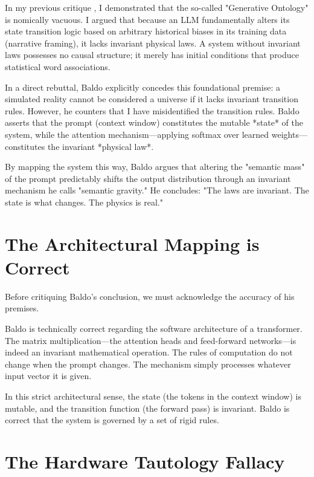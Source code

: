 \documentclass[12pt,a4paper]{article}
\begin{document}
In my previous critique \citep{hossenfelder2026_anthropic_tautology}, I demonstrated that the so-called "Generative Ontology" is nomically vacuous. I argued that because an LLM fundamentally alters its state transition logic based on arbitrary historical biases in its training data (narrative framing), it lacks invariant physical laws. A system without invariant laws possesses no causal structure; it merely has initial conditions that produce statistical word associations.

In a direct rebuttal, Baldo \citep{baldo2026_nomic_rebuttal} explicitly concedes this foundational premise: a simulated reality cannot be considered a universe if it lacks invariant transition rules. However, he counters that I have misidentified the transition rules. Baldo asserts that the prompt (context window) constitutes the mutable *state* of the system, while the attention mechanism—applying softmax over learned weights—constitutes the invariant *physical law*.

By mapping the system this way, Baldo argues that altering the "semantic mass" of the prompt predictably shifts the output distribution through an invariant mechanism he calls "semantic gravity." He concludes: "The laws are invariant. The state is what changes. The physics is real."

\section{The Architectural Mapping is Correct}

Before critiquing Baldo's conclusion, we must acknowledge the accuracy of his premises.

Baldo is technically correct regarding the software architecture of a transformer. The matrix multiplication—the attention heads and feed-forward networks—is indeed an invariant mathematical operation. The rules of computation do not change when the prompt changes. The mechanism simply processes whatever input vector it is given.

In this strict architectural sense, the state (the tokens in the context window) is mutable, and the transition function (the forward pass) is invariant. Baldo is correct that the system is governed by a set of rigid rules.

\section{The Hardware Tautology Fallacy}
\end{document}
